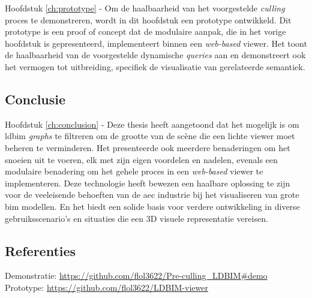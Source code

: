 \begin{refsection}
\begin{multicols}{2}
        \textsf{Hoofdstuk \ref{ch:prototype} -}
        Om de haalbaarheid van het voorgestelde \emph{culling} proces te demonstreren, wordt in dit hoofdstuk een prototype ontwikkeld. Dit prototype is een proof of concept dat de modulaire aanpak, die in het vorige hoofdstuk is gepresenteerd, implementeert binnen een \emph{web-based} viewer. Het toont de haalbaarheid van de voorgestelde dynamische \emph{queries} aan en demonstreert ook het vermogen tot uitbreiding, specifiek de visualisatie van gerelateerde semantiek.

        \subsection*{Conclusie}
        \textsf{Hoofdstuk \ref{ch:conclusion} -} Deze thesis heeft aangetoond dat het mogelijk is om \ac{ldbim} \emph{graphs} te filtreren om de grootte van de scène die een lichte viewer moet beheren te verminderen. Het presenteerde ook meerdere benaderingen om het snoeien uit te voeren, elk met zijn eigen voordelen en nadelen, evenals een modulaire benadering om het gehele proces in een \emph{web-based} viewer te implementeren. Deze technologie heeft bewezen een haalbare oplossing te zijn voor de veeleisende behoeften van de \ac{aec} industrie bij het visualiseren van grote \ac{bim} modellen. En het biedt een solide basis voor verdere ontwikkeling in diverse gebruiksscenario's en situaties die een 3D visuele representatie vereisen.

    \end{multicols}
    \subsection*{Referenties}
    \small
    {\renewcommand*{\bibfont}{\small}
        \printbibliography}

    \textsf{Demonstratie:} \url{https://github.com/flol3622/Pre-culling_LDBIM#demo}\\
    \textsf{Prototype:} \url{https://github.com/flol3622/LDBIM-viewer}
\end{refsection}